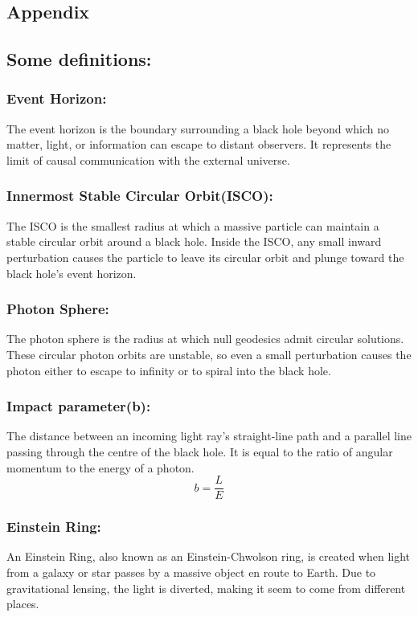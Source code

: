 \documentclass[12pt]{article}
\begin{document}
\begin{itemize}
\section{Appendix}
\subsection{\textbf{Some definitions:}}
\subsubsection{\textbf{Event Horizon:}} The event horizon is the boundary surrounding a black hole beyond which no matter, light, or information can escape to distant observers. It represents the limit of causal communication with the external universe.
\subsubsection{\textbf{Innermost Stable Circular Orbit(ISCO):}} The ISCO is the smallest radius at which a massive particle can maintain a stable circular orbit around a black hole. Inside the ISCO, any small inward perturbation causes the particle to leave its circular orbit and plunge toward the black hole's event horizon.
\subsubsection{\textbf{Photon Sphere:}} The photon sphere is the radius at which null geodesics admit circular solutions. These circular photon orbits are unstable, so even a small perturbation causes the photon either to escape to infinity or to spiral into the black hole. 
\subsubsection{\textbf{Impact parameter(b):}} The distance between an incoming light ray's straight-line path and a parallel line passing through the centre of the black hole. It is equal to the ratio of angular momentum to the energy of a photon.
\begin{equation}
b= \frac{L}{E}
\end{equation}

\subsubsection{\textbf{Einstein Ring:}} An Einstein Ring, also known as an Einstein-Chwolson ring, is created when light from a galaxy or star passes by a massive object en route to Earth. Due to gravitational lensing, the light is diverted, making it seem to come from different places.  

\end{itemize}
\end{document}
